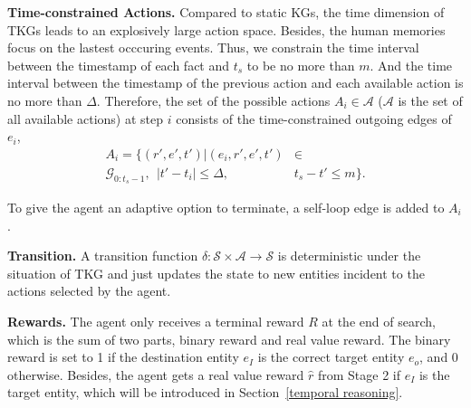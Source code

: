 \documentclass[11pt,a4paper]{article}
\begin{document}
{\bf Time-constrained Actions.} Compared to static KGs, the time dimension of
TKGs leads to an explosively large action space. Besides, the human memories
focus on the lastest occcuring events. Thus,  
we constrain the time interval between the timestamp of each fact and $t_s$ to
be no more than $m$. And the time interval between the timestamp of the previous
action and each available action is no more than $\Delta$. Therefore, the set of
the possible actions $A_i \in \mathcal{A}$ ($\mathcal{A}$ is the set of all
available actions) at step $i$ consists of the time-constrained outgoing edges
of $e_{i}$,
%
\begin{align}\label{eq:1}
 A_{i}=\{(r', e', t')| (e_{i}, r', e', t') &\in \nonumber\\
 \mathcal{G}_{0:t_{s}-1},\ \ |t'-t_{i}|\leq \Delta,\ \ &t_{s} - t' \leq m\}.
\end{align}
%

To give the agent an adaptive option
to terminate, a self-loop edge is added to $A_{i}$.  

{\bf Transition.} A transition function $\delta: \mathcal{S} \times \mathcal{A}
\rightarrow \mathcal{S}$ is deterministic under the situation of TKG and just
updates the state to new entities incident to the actions selected by the agent.

{\bf Rewards.} The agent only receives a terminal reward $R$ at the end of search,
which is the sum of two parts, binary reward and real value reward. The binary
reward is set to 1 if the destination entity $e_{I}$ is the correct target
entity $e_{o}$, and 0 otherwise. Besides, the agent gets a real value reward
$\hat{r}$ from Stage 2 if $e_I$ is the target entity, which will be introduced
in Section~\ref{temporal reasoning}.
\end{document}
